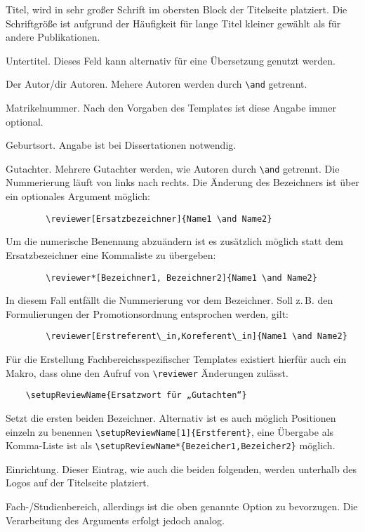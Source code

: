 \documentclass[
	ngerman,
	ruledheaders=section,%
	class=report,%
	thesis={type=bachelor},%
	accentcolor=9c,%
	custommargins=true,%
	marginpar=false,%
	parskip=half-,%
	fontsize=11pt,%
]{tudapub}
\begin{document}
\begin{description}
	\item[title] Titel, wird in sehr großer Schrift im obersten Block der Titelseite platziert. Die Schriftgröße ist aufgrund der Häufigkeit für lange Titel kleiner gewählt als für andere Publikationen.
	\item[subtitle] Untertitel. Dieses Feld kann alternativ für eine Übersetzung genutzt werden.
	\item[author] Der Autor/dir Autoren. Mehere Autoren werden durch \verb+\and+ getrennt.
	\item[studentID] Matrikelnummer. Nach den Vorgaben des Templates ist diese Angabe immer optional.
	\item[birthplace] Geburtsort. Angabe ist bei Dissertationen notwendig.
	\item[reviewer] Gutachter. Mehrere Gutachter werden, wie Autoren durch \verb+\and+ getrennt. Die Nummerierung läuft von links nach rechts.
	Die Änderung des Bezeichners ist über ein optionales Argument möglich:
	\begin{verbatim}
		\reviewer[Ersatzbezeichner]{Name1 \and Name2}
	\end{verbatim}
	Um die numerische Benennung abzuändern ist es zusätzlich möglich statt dem Ersatzbezeichner eine Kommaliste zu übergeben:
	\begin{verbatim}
		\reviewer*[Bezeichner1, Bezeichner2]{Name1 \and Name2}
	\end{verbatim}
	In diesem Fall entfällt die Nummerierung vor dem Bezeichner. Soll z.\,B. den Formulierungen der Promotionsordnung entsprochen werden, gilt:
	\begin{verbatim}
		\reviewer[Erstreferent\_in,Koreferent\_in]{Name1 \and Name2}
	\end{verbatim}
	Für die Erstellung Fachbereichsspezifischer Templates existiert hierfür auch ein Makro, dass ohne den Aufruf von \verb+\reviewer+ Änderungen zulässt.
	\begin{verbatim}
	\setupReviewName{Ersatzwort für „Gutachten“}
	\end{verbatim}
	Setzt die ersten beiden Bezeichner. Alternativ ist es auch möglich Positionen einzeln zu benennen \verb+\setupReviewName[1]{Erstferent}+, eine Übergabe als Komma-Liste ist als \verb+\setupReviewName*{Bezeicher1,Bezeicher2}+ möglich.
	\item[institution] Einrichtung. Dieser Eintrag, wie auch die beiden folgenden, werden unterhalb des Logos auf der Titelseite platziert.
	\item[department] Fach-/Studienbereich, allerdings ist die oben genannte Option zu bevorzugen. Die Verarbeitung des Arguments erfolgt jedoch analog.


\end{description}
\end{document}
